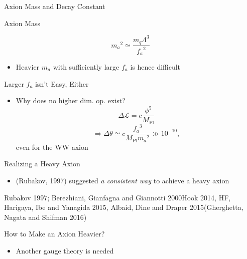 \documentclass[17pt,ignorenonframetext,]{beamer}
\providecommand{\tightlist}{%
  \setlength{\itemsep}{0pt}\setlength{\parskip}{0pt}}
\begin{document}
\begin{frame}{Axion Mass and Decay Constant}

\begin{block}{Axion Mass}

\[
{m_a}^2 \simeq \frac{m_q \Lambda^3}{{f_a}^2}
\]

\begin{itemize}
\tightlist
\item
  Heavier \(m_a\) with sufficiently large \(f_a\) is hence difficult
\end{itemize}

\end{block}

\end{frame}

\begin{frame}{Larger \(f_a\) isn't Easy, Either}

\begin{itemize}
\tightlist
\item
  Why does no higher dim. op. exist? \[
  \Delta \mathcal L = c\frac{\phi^5}{M_\text{Pl}}
  \] \[
  \Rightarrow\Delta \theta \simeq c\frac{{f_a}^3}{M_\text{Pl}{m_a}^2} \gg 10^{-10},
  \] even for the WW axion
\end{itemize}

\end{frame}

\begin{frame}{Realizing a Heavy Axion}

\begin{itemize}
\tightlist
\item
  (Rubakov, 1997) suggested \emph{a consistent way} to achieve a heavy
  axion
\end{itemize}

\tiny Rubakov 1997; Berezhiani, Gianfagna and Giannotti
2000\newline Hook 2014, HF, Harigaya, Ibe and Yanagida 2015, Albaid,
Dine and Draper 2015\newline (Gherghetta, Nagata and Shifman 2016)

\end{frame}

\begin{frame}{How to Make an Axion Heavier?}

\begin{itemize}
\tightlist
\item
  Another gauge theory is needed
\end{itemize}

\begin{center}
\end{center}

\end{frame}
\end{document}

